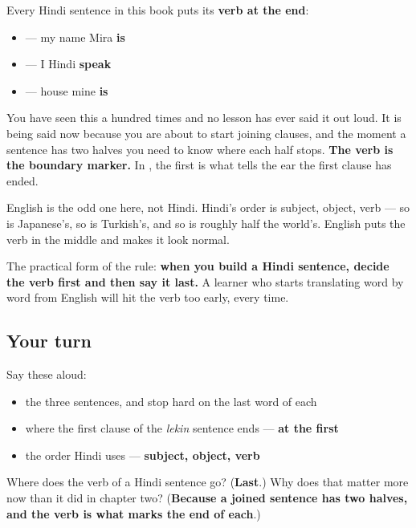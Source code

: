 \begin{grammarlens}[title={Grammar Lens: a rule you have been obeying for sixty-eight chapters}]
Every Hindi sentence in this book puts its \textbf{verb at the end}:

\begin{itemize}
\raggedright
  \item \textbf{   } — my name Mira \textbf{is}
  \item \textbf{   } — I Hindi \textbf{speak}
  \item \textbf{  } — house mine \textbf{is}
\end{itemize}

You have seen this a hundred times and no lesson has ever said it out loud. It is being said now because you are about to start joining clauses, and the moment a sentence has two halves you need to know where each half stops. \textbf{The verb is the boundary marker.} In \textbf{     }, the first \textbf{} is what tells the ear the first clause has ended.

English is the odd one here, not Hindi. Hindi's order is subject, object, verb — so is Japanese's, so is Turkish's, and so is roughly half the world's. English puts the verb in the middle and makes it look normal.

The practical form of the rule: \textbf{when you build a Hindi sentence, decide the verb first and then say it last.} A learner who starts translating word by word from English will hit the verb too early, every time.
\end{grammarlens}

\subsection*{Your turn}
Say these aloud:

\begin{itemize}
\raggedright
  \item the three sentences, and stop hard on the last word of each
  \item where the first clause of the \emph{lekin} sentence ends — \textbf{at the first }
  \item the order Hindi uses — \textbf{subject, object, verb}
\end{itemize}

\begin{tcolorbox}[breakable,colback=teal!4,colframe=teal!35!black,title={Before you move on}]
Where does the verb of a Hindi sentence go? (\textbf{Last}.) Why does that matter more now than it did in chapter two? (\textbf{Because a joined sentence has two halves, and the verb is what marks the end of each}.)
\end{tcolorbox}
